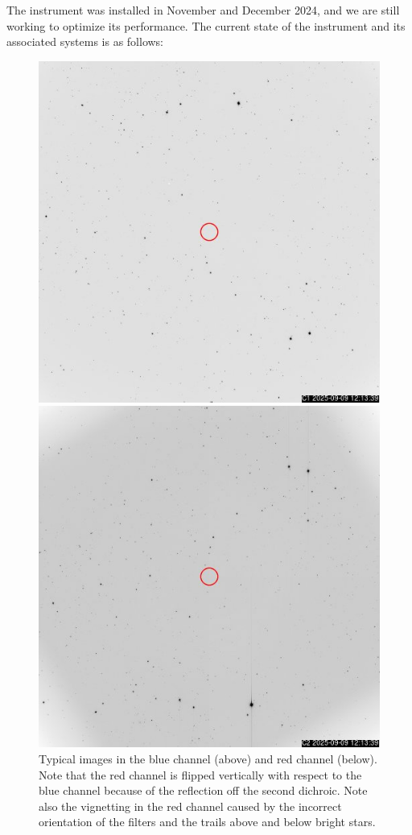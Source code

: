 The instrument was installed in November and December 2024, and we are still working to optimize its performance. The current state of the instrument and its associated systems is as follows:

\begin{figure}
\centering
\includegraphics[width=0.65\linewidth]{figure/C1.jpg}

\includegraphics[width=0.65\linewidth]{figure/C2.jpg}

\caption{Typical images in the blue channel (above) and red channel (below). Note that the red channel is flipped vertically with respect to the blue channel because of the reflection off the second dichroic. Note also the vignetting in the red channel caused by the incorrect orientation of the filters and the trails above and below bright stars.}
\label{figure:typical-images}
\end{figure}

